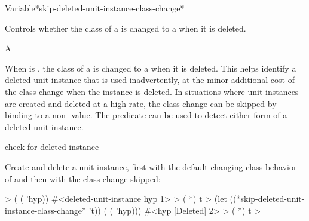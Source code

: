 \documentclass[10pt,twoside,english,pdftex]{article}
\begin{document}
\begin{functiondoc}%
  {Variable}{*skip-deleted-unit-instance-class-change*}{}%

\fnsyntax

\fnpurpose Controls whether the class of a  is changed to
a  when it is deleted.

\fnpackage {}

\fnmodule {}

\fnvaluetype A 

\fninitialvalue \nil

\fndescription 
%
When  is \nil, the
class of a  is changed to
a  when it is deleted.  This
helps identify a deleted unit instance that is used inadvertently, at the
minor additional cost of the class change when the instance is deleted.  In
situations where unit instances are created and deleted at a high rate, the
class change can be skipped by binding
 to a non-\nil{}
value.  The predicate  can be used
to detect either form of a deleted unit instance.

\begin{alsos}{check-for-deleted-instance}
\end{alsos}

\fnexample 
%
%
%
%
Create and delete a  unit instance, first with the default
changing-class behavior of  and then
with the class-change skipped:
%
\W\supp
\begin{example}
  > ( ( 'hyp))
  #<deleted-unit-instance hyp 1>
  > ( *)
  t
  > (let ((*skip-deleted-unit-instance-class-change* 't))
       ( ( 'hyp)))
  #<hyp [Deleted] 2>
  > ( *)
  t
  >
\end{example}

\end{functiondoc}
\end{document}

